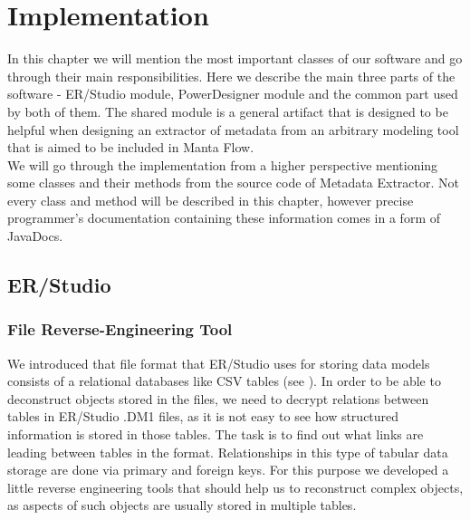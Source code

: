 \chapter{Implementation}

In this chapter we will mention the most important classes of our software and go through their main responsibilities. Here we describe the main three parts of the software - ER/Studio module, PowerDesigner module and the common part used by both of them. The shared module is a general artifact that is designed to be helpful when designing an extractor of metadata from an arbitrary modeling tool that is aimed to be included in Manta Flow. \\

We will go through the implementation from a higher perspective mentioning some classes and their methods from the source code of Metadata Extractor. 
Not every class and method will be described in this chapter, however precise programmer's documentation containing these information comes in a form of JavaDocs.

\section{ER/Studio}

\subsection{File Reverse-Engineering Tool}
\label{subsec:dm1_tool}

We introduced that file format that ER/Studio uses for storing data models consists of a relational databases like CSV tables (see ).
In order to be able to deconstruct objects stored in the files, we need to decrypt relations between tables in ER/Studio .DM1 files, as it is not easy to see how structured information is stored in those tables.
The task is to find out what links are leading between tables in the format. Relationships in this type of tabular data storage are done via primary and foreign keys. For this purpose we developed a little reverse engineering tools that should help us to reconstruct complex objects, as aspects of such objects are usually stored in multiple tables. \\

